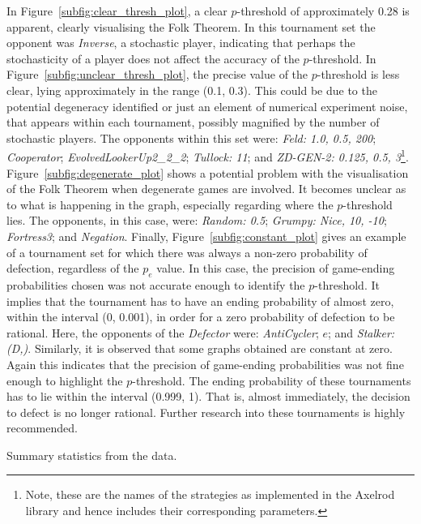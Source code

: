 In Figure~\ref{subfig:clear_thresh_plot}, a clear \(p\)-threshold of approximately
0.28 is apparent, clearly visualising the Folk Theorem. In this tournament set
the opponent was \textit{Inverse}, a stochastic player, indicating that perhaps
the stochasticity of a player does not affect the accuracy of the
\(p\)-threshold. In Figure~\ref{subfig:unclear_thresh_plot}, the precise value of
the \(p\)-threshold is less clear, lying approximately in the range (0.1, 0.3). This
could be due to the potential degeneracy identified or just an element of
numerical experiment noise,
that appears within each tournament, possibly magnified by the number
of stochastic players. The opponents within this set
were: \textit{Feld: 1.0, 0.5, 200}; \textit{Cooperator};
\textit{EvolvedLookerUp2\_2\_2}; \textit{Tullock: 11}; and \textit{ZD-GEN-2:
0.125, 0.5, 3}\footnote{Note, these are the names of the strategies as
implemented in the Axelrod library and hence includes their corresponding parameters.}. Figure~\ref{subfig:degenerate_plot} shows a potential problem
with the visualisation of the Folk Theorem when degenerate games are involved.
It becomes unclear as to what is happening in the graph,
especially regarding where the \(p\)-threshold lies. The opponents, in this case, were:
\textit{Random: 0.5}; \textit{Grumpy: Nice, 10, -10}; \textit{Fortress3}; and
\textit{Negation}. Finally, Figure~\ref{subfig:constant_plot} gives an example
of a tournament set for which there was always a non-zero probability of
defection, regardless of the \(p_{e}\) value. In this case, the
precision of game-ending probabilities chosen was not accurate enough to
identify the \(p\)-threshold. It implies that the tournament has to have an
ending probability of almost zero, within the interval (0, 0.001), in order for a
zero probability of defection to be rational. Here, the opponents of the
\textit{Defector} were: \textit{AntiCycler}; \textit{\(e\)}; and
\textit{Stalker: (D,)}. Similarly, it is observed that some graphs obtained
are constant at zero. Again this indicates that the precision of game-ending
probabilities was not fine enough to highlight the \(p\)-threshold. The ending probability of these tournaments has to lie within the interval
(0.999, 1). That is, almost immediately, the decision to defect is no longer
rational. Further research into these tournaments is highly recommended.

\begin{table}
    \resizebox{\textwidth}{!}{}
    \caption{Summary statistics from the data.}\label{tab:summary_stats}
\end{table}
   
